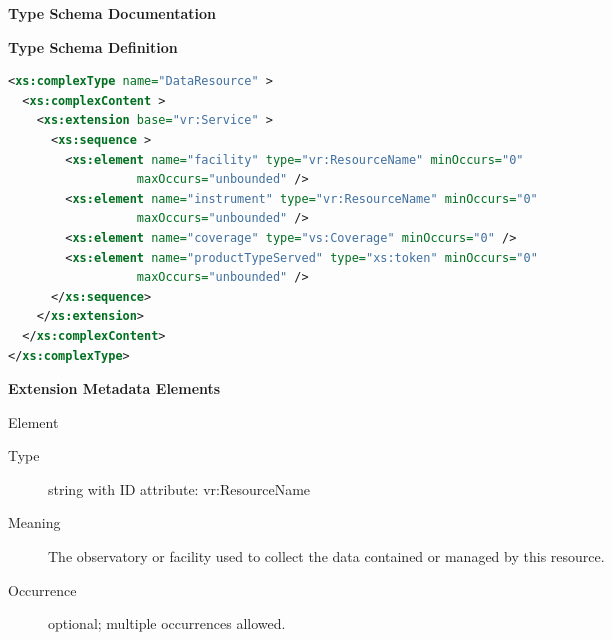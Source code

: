 \documentclass[11pt,a4paper]{ivoa}
\begin{document}
\begin{generated}
\begingroup
        \renewcommand*\descriptionlabel[1]{%
        \hbox to 5.5em{\emph{#1}\hfil}}\vspace{2ex}\noindent\textbf{ Type Schema Documentation}



\vspace{1ex}\noindent\textbf{ Type Schema Definition}

\begin{lstlisting}[language=XML,basicstyle=\footnotesize]
<xs:complexType name="DataResource" >
  <xs:complexContent >
    <xs:extension base="vr:Service" >
      <xs:sequence >
        <xs:element name="facility" type="vr:ResourceName" minOccurs="0"
                  maxOccurs="unbounded" />
        <xs:element name="instrument" type="vr:ResourceName" minOccurs="0"
                  maxOccurs="unbounded" />
        <xs:element name="coverage" type="vs:Coverage" minOccurs="0" />
        <xs:element name="productTypeServed" type="xs:token" minOccurs="0"
                  maxOccurs="unbounded" />
      </xs:sequence>
    </xs:extension>
  </xs:complexContent>
</xs:complexType>
\end{lstlisting}

\vspace{0.5ex}\noindent\textbf{ Extension Metadata Elements}

\begingroup\small\begin{bigdescription}\item[Element \xmlel{facility}]
\begin{description}
\item[Type] string with ID attribute: vr:ResourceName
\item[Meaning]
                     The observatory or facility used to collect the data
                     contained or managed by this resource.

\item[Occurrence] optional; multiple occurrences allowed.


\end{description}
\end{bigdescription}
\end{generated}
\end{document}
